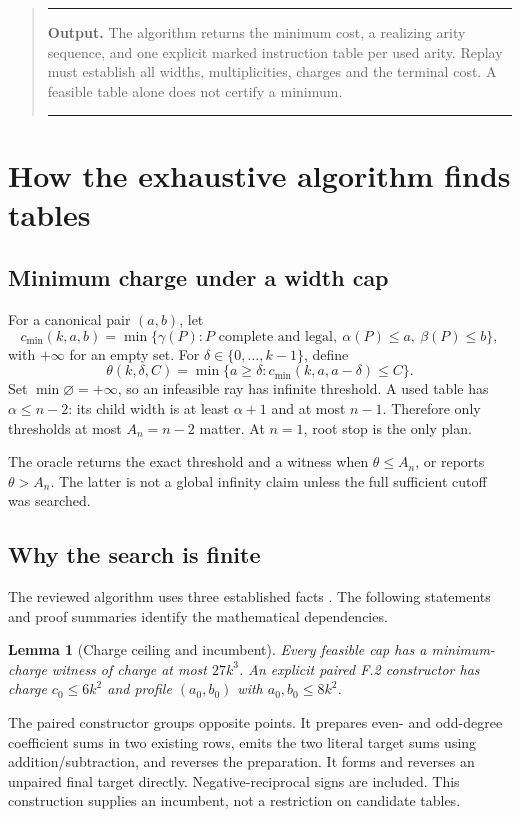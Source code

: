 \documentclass[11pt,letterpaper]{article}
\newtheorem{lemma}[theorem]{Lemma}
\newenvironment{scopebox}{\begin{quote}\small\color{navy}\hrule\vspace{6pt}}{\vspace{6pt}\hrule\end{quote}}
\begin{document}
\begin{scopebox}
\textbf{Output.} The algorithm returns the minimum cost, a realizing
arity sequence, and one explicit marked instruction table per used
arity. Replay must establish all widths, multiplicities, charges and
the terminal cost. A feasible table alone does not certify a minimum.
\end{scopebox}

\section{How the exhaustive algorithm finds tables}\label{sec:algorithm}
\subsection{Minimum charge under a width cap}
For a canonical pair \((a,b)\), let
\[
c_{\min}(k,a,b)=
\min\{\gamma(P):P\text{ complete and legal},\
 \alpha(P)\le a,\ \beta(P)\le b\},
\tag{11}
\]
with \(+\infty\) for an empty set. For
\(\delta\in\{0,\ldots,k-1\}\), define
\[
\theta(k,\delta,C)=
\min\{a\ge\delta:c_{\min}(k,a,a-\delta)\le C\}.
\tag{12}
\]
Set \(\min\varnothing=+\infty\), so an infeasible ray has infinite
threshold.
A used table has \(\alpha\le n-2\): its child width is at least
\(\alpha+1\) and at most \(n-1\). Therefore only thresholds at most
\(A_n=n-2\) matter. At \(n=1\), root stop is the only plan.

The oracle returns the exact threshold and a witness when
\(\theta\le A_n\), or reports \(\theta>A_n\).
The latter is not a global infinity claim unless the full sufficient
cutoff was searched.

\subsection{Why the search is finite}\label{sec:bounds}
The reviewed algorithm uses three established facts
\cite{threshold,normalization,outer}. The following statements and
proof summaries identify the mathematical dependencies.

\begin{lemma}[Charge ceiling and incumbent]\label{lem:charge}
Every feasible cap has a minimum-charge witness of charge at most
\(27k^3\). An explicit paired F.2 constructor has charge
\(c_0\le6k^2\) and profile \((a_0,b_0)\) with \(a_0,b_0\le8k^2\).
\end{lemma}
The paired constructor groups opposite points. It prepares even-
and odd-degree coefficient sums in two existing rows, emits the two
literal target sums using addition/subtraction, and reverses the
preparation. It forms and reverses an unpaired final target directly.
Negative-reciprocal signs are included. This construction supplies
an incumbent, not a restriction on candidate tables.
\end{document}
